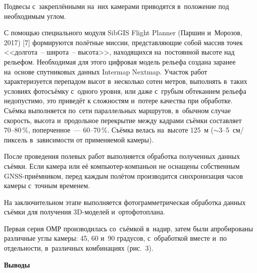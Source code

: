 Подвесы с~закреплёнными на~них камерами приводятся в~положение под необходимым углом.

С помощью специального модуля SibGIS Flight Planner (Паршин и~Морозов, 2017) [7] формируются полётные миссии, представляющие собой массив точек <<долгота~-- широта~-- высота>>, находящихся на~постоянной высоте над рельефом. Необходимая для этого цифровая модель рельефа создана заранее на~основе спутниковых данных Intermap Nextmap. Участок работ характеризуется перепадом высот в~несколько сотен метров, выполнять в~таких условиях фотосъёмку с~одного уровня, или даже с~грубым обтеканием рельефа недопустимо, это приведёт к сложностям и~потере качества при обработке. Съёмка выполняется по~сети параллельных маршрутов, в~обычном случае скорость, высота и~продольное перекрытие между кадрами съёмки составляет 70--80\,\%, поперченное~--- 60--70\,\%. Съёмка велась на~высоте 125~м ($\sim$3--5~см/пиксель в~зависимости от применяемой камеры).

После проведения полевых работ выполняется обработка полученных данных съёмки. Если камера или её компьютер-компаньон не оснащены собственным GNSS-приёмником, перед каждым полётом производится синхронизация часов камеры с~точным временем.

На заключительном этапе выполняется фотограмметрическая обработка данных съёмки для получения 3D-моделей и~ортофотоплана.

Первая серия ОМР производилась со~съёмкой в~надир, затем были апробированы различные углы камеры: 45, 60 и~90 градусов, с~обработкой вместе и~по отдельности, в~различных комбинациях (рис.~3).



\textbf{Выводы}

